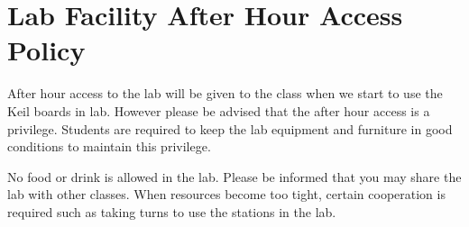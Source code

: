 
\section*{Lab Facility After Hour Access Policy} 
After hour access to the lab will be given to the class 
when we start to use the Keil boards in lab. 
However please be advised that the after hour access is a privilege. 
Students are required to keep the lab equipment and furniture 
in good conditions to maintain this privilege. 

No food or drink is allowed in the lab. 
Please be informed that you may share the lab with other classes.  
When resources become too tight, certain cooperation is required 
such as taking turns to use the stations in the lab. 		

